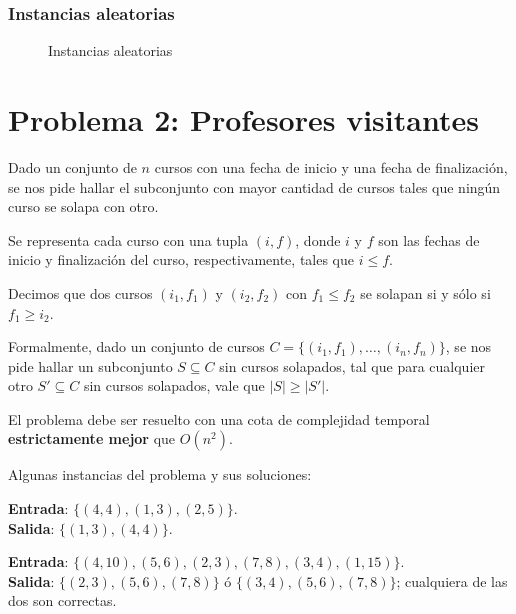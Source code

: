 \documentclass[a4paper, 10pt, twoside]{article}
\newcommand{\tresgraficos}[3]{
    \newcommand{\separacion}{-2.2em}
    \vspace{\separacion}
    
    \vspace{\separacion}
    
    \vspace{\separacion}
    
}
\begin{document}
\subsubsection{Instancias aleatorias}

\begin{figure}[H]
  \centering
  \tresgraficos{problema1-instancias-aleatorias}
               {problema1-instancias-aleatorias-logn}
               {problema1-instancias-aleatorias-n}
  \caption{Instancias aleatorias}
\end{figure}




\newpage

\section{Problema 2: Profesores visitantes}

Dado un conjunto de $n$ cursos con una fecha de inicio y una fecha de finalización, se nos pide hallar el subconjunto con mayor cantidad de cursos tales que ningún curso se solapa con otro.

Se representa cada curso con una tupla $(i, f)$, donde $i$ y $f$ son las fechas de inicio y finalización del curso, respectivamente, tales que $i \leq f$.

Decimos que dos cursos $(i_1, f_1)$ y $(i_2, f_2)$ con $f_1 \leq f_2$ se solapan si y sólo si $f_1 \geq i_2$.

Formalmente, dado un conjunto de cursos $C = \{ (i_1, f_1), \ldots, (i_n, f_n) \}$, se nos pide hallar un subconjunto $S \subseteq C$ sin cursos solapados, tal que para cualquier otro $S' \subseteq C$ sin cursos solapados, vale que $|S| \geq |S'|$.

El problema debe ser resuelto con una cota de complejidad temporal \textbf{estrictamente mejor} que $O(n^2)$.

Algunas instancias del problema y sus soluciones:

\textbf{Entrada}: $\{(4, 4), (1, 3), (2, 5)\}$.\\
\textbf{Salida}: $\{(1, 3), (4, 4)\}$.

\textbf{Entrada}: $\{(4, 10), (5, 6), (2, 3), (7, 8), (3, 4), (1, 15)\}$.\\
\textbf{Salida}: $\{(2, 3), (5, 6), (7, 8)\}$ ó $\{(3, 4), (5, 6), (7, 8)\}$; cualquiera de las dos son correctas.
\end{document}
